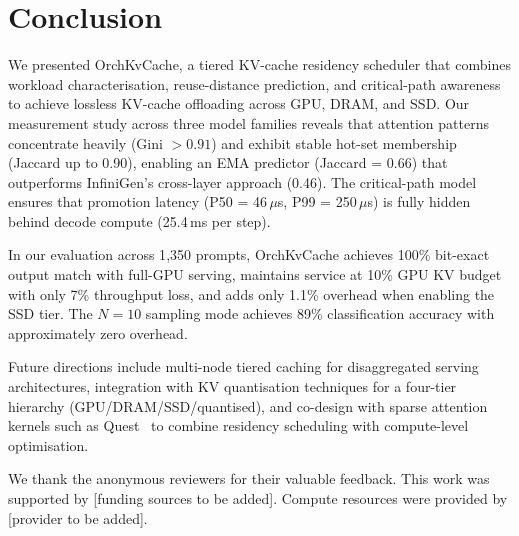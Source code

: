 \documentclass[acmsmall,nonacm,screen]{acmart}
\newcommand{\sys}{OrchKvCache}
\begin{document}
\section{Conclusion}\label{sec:conclusion}

We presented \sys{}, a tiered KV-cache residency scheduler that combines
workload characterisation, reuse-distance prediction, and critical-path
awareness to achieve lossless KV-cache offloading across GPU, DRAM, and SSD.
Our measurement study across three model families reveals that attention
patterns concentrate heavily (Gini $> 0.91$) and exhibit stable hot-set
membership (Jaccard up to 0.90), enabling an EMA predictor (Jaccard = 0.66)
that outperforms InfiniGen's cross-layer approach (0.46).  The critical-path
model ensures that promotion latency (P50 = 46\,$\mu$s, P99 = 250\,$\mu$s)
is fully hidden behind decode compute (25.4\,ms per step).

In our evaluation across 1{,}350 prompts, \sys{} achieves 100\% bit-exact
output match with full-GPU serving, maintains service at 10\% GPU KV budget
with only 7\% throughput loss, and adds only 1.1\% overhead when enabling
the SSD tier.  The $N{=}10$ sampling mode achieves 89\% classification
accuracy with approximately zero overhead.

Future directions include multi-node tiered caching for disaggregated
serving architectures, integration with KV quantisation techniques for
a four-tier hierarchy (GPU/DRAM/SSD/quantised), and co-design with
sparse attention kernels such as Quest~\cite{tang2024quest} to combine
residency scheduling with compute-level optimisation.


\begin{acks}
We thank the anonymous reviewers for their valuable feedback.
This work was supported by [funding sources to be added].
Compute resources were provided by [provider to be added].
\end{acks}





\appendix
\end{document}
